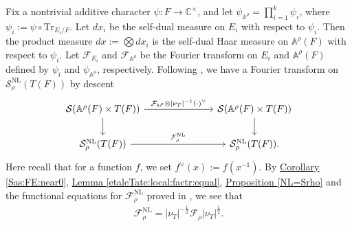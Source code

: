 \documentclass[10pt]{amsart}
\theoremstyle{definition}
\newtheorem{remark}[theorem]{Remark}
\numberwithin{equation}{section}
\numberwithin{equation}{subsection}
\newcommand{\RR}{\mathbb{R}}
\begin{document}

Fix a nontrivial additive character $\psi:F\to \mathbb{C}^\times$, and let $\psi_{\mathbb{A}^\rho} = \prod\limits_{i=1}^k\psi_{i}$, where $\psi_i:=\psi\circ\mathrm{Tr}_{E_i/F}$. Let $dx_i$ be the self-dual measure on $E_i$ with respect to $\psi_i$. Then the product measure $dx:=\bigotimes dx_i$ is the self-dual Haar measure on $\mathbb{A}^{\rho}(F)$ with respect to $\psi_i$. Let $\mathcal{F}_{E_i}$ and $\mathcal{F}_{\mathbb{A}^\rho}$ be the Fourier transform on $E_i$ and $\mathbb{A}^\rho(F)$ defined by $\psi_i$ and $\psi_{\mathbb{A}^\rho}$, respectively. Following \cite{Luo:Ngo}, we have a Fourier transform on $\mathcal{S}_\rho^{\mathrm{NL}}(T(F))$ by descent
\begin{equation*}
    \begin{tikzcd}
        \mathcal{S}(\mathbb{A}^\rho(F)\times T(F))\arrow[rrr,"\mathcal{F}_{\mathbb{A}^\rho}\otimes  |\nu_T|^{-1}(\cdot)^\lor"]\arrow[d]& & & \mathcal{S}(\mathbb{A}^\rho(F)\times T(F))\arrow[d]\\
       \mathcal{S}_\rho^{\mathrm{NL}}(T(F))\arrow[rrr,"\mathcal{F}_\rho^{\mathrm{NL}}"]& & &\mathcal{S}_\rho^{\mathrm{NL}}(T(F)).
    \end{tikzcd}
\end{equation*}
Here recall that for a function $f$, we set $f^\vee(x):= f(x^{-1})$. By \hyperref[Sas:FE:near0]{Corollary \ref{Sas:FE:near0}}, \hyperref[etaleTate:local:factr:equal]{Lemma \ref{etaleTate:local:factr:equal}}, \hyperref[NL=Srho]{Proposition \ref{NL=Srho}}  and the functional equations for $\mathcal{F}_\rho^{\mathrm{NL}}$ proved in \cite{Luo:Ngo}, we see that
\begin{align*}
    \mathcal{F}_\rho^{\mathrm{NL}} = |\nu_T|^{-\frac{1}{2}}\mathcal{F}_{\rho}|\nu_T|^{\frac{1}{2}}.
\end{align*}
\end{document}
